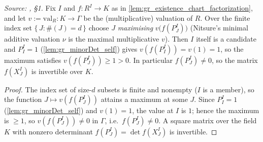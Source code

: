 \begin{lemma}\leanok
  \label{lem:gr_existence_minimal_valuation}
  \textit{Source: \cite{nitsure-hilbert-quot}, \S 1.}
  Fix \(I\) and \(f : R^I \to K\) as in \cref{lem:gr_existence_chart_factorization},
  and let \(v := \mathrm{val}_R : K \to \Gamma\) be the (multiplicative) valuation
  of \(R\). Over the finite index set \(\{\, J : \#(J) = d \,\}\) choose \(J\)
  \emph{maximising} \(v\bigl(f(P^I_J)\bigr)\) (Nitsure's minimal additive valuation
  \(\nu\) is the maximal multiplicative \(v\)). Then \(I\) itself is a candidate and
  \(P^I_I = 1\) (\cref{lem:gr_minorDet_self}) gives \(v(f(P^I_I)) = v(1) = 1\), so
  the maximum satisfies \(v(f(P^I_J)) \ge 1 > 0\). In particular \(f(P^I_J) \ne 0\),
  so the matrix \(f(X^I_J)\) is invertible over \(K\).
\end{lemma}
\begin{proof}
  \leanok
  The index set of size-\(d\) subsets is finite and nonempty (\(I\) is a member),
  so the function \(J \mapsto v(f(P^I_J))\) attains a maximum at some \(J\). Since
  \(P^I_I = 1\) (\cref{lem:gr_minorDet_self}) and \(v(1) = 1\), the value at \(I\)
  is \(1\); hence the maximum is \(\ge 1\), so \(v(f(P^I_J)) \ne 0\) in \(\Gamma\),
  i.e.\ \(f(P^I_J) \ne 0\). A square matrix over the field \(K\) with nonzero
  determinant \(f(P^I_J) = \det f(X^I_J)\) is invertible.
\end{proof}

